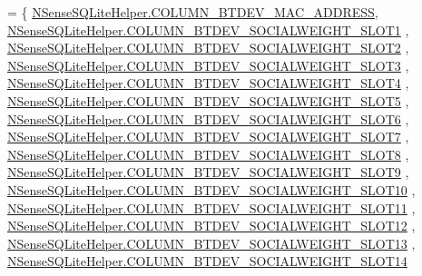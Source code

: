 \begin{DoxyCode}
= \{ 
            \hyperlink{classcs_1_1nsense_1_1db_1_1_n_sense_s_q_lite_helper_a66d760b81948efc86eafb0bb5147c2a5}{NSenseSQLiteHelper.COLUMN\_BTDEV\_MAC\_ADDRESS},
            \hyperlink{classcs_1_1nsense_1_1db_1_1_n_sense_s_q_lite_helper_a2d1874e05b0dcb1f6628c54ed0b027af}{NSenseSQLiteHelper.COLUMN\_BTDEV\_SOCIALWEIGHT\_SLOT1}
      ,
            \hyperlink{classcs_1_1nsense_1_1db_1_1_n_sense_s_q_lite_helper_aa8f004540621f676c6776de2c9f44b37}{NSenseSQLiteHelper.COLUMN\_BTDEV\_SOCIALWEIGHT\_SLOT2}
      ,
            \hyperlink{classcs_1_1nsense_1_1db_1_1_n_sense_s_q_lite_helper_a4015db276ba22912d70ece5b54c81b43}{NSenseSQLiteHelper.COLUMN\_BTDEV\_SOCIALWEIGHT\_SLOT3}
      ,
            \hyperlink{classcs_1_1nsense_1_1db_1_1_n_sense_s_q_lite_helper_a0e353ae98c5e536373cea2af063fc1be}{NSenseSQLiteHelper.COLUMN\_BTDEV\_SOCIALWEIGHT\_SLOT4}
      ,
            \hyperlink{classcs_1_1nsense_1_1db_1_1_n_sense_s_q_lite_helper_a7dbad974bb6a01f5f64b4da61408bec5}{NSenseSQLiteHelper.COLUMN\_BTDEV\_SOCIALWEIGHT\_SLOT5}
      ,
            \hyperlink{classcs_1_1nsense_1_1db_1_1_n_sense_s_q_lite_helper_a892b29c63543d2510b4f543ede759c53}{NSenseSQLiteHelper.COLUMN\_BTDEV\_SOCIALWEIGHT\_SLOT6}
      ,
            \hyperlink{classcs_1_1nsense_1_1db_1_1_n_sense_s_q_lite_helper_aff13368b80bfd063e70429ef497c4799}{NSenseSQLiteHelper.COLUMN\_BTDEV\_SOCIALWEIGHT\_SLOT7}
      ,
            \hyperlink{classcs_1_1nsense_1_1db_1_1_n_sense_s_q_lite_helper_a168a795573ef5c7bb454fdd111ba33bc}{NSenseSQLiteHelper.COLUMN\_BTDEV\_SOCIALWEIGHT\_SLOT8}
      ,
            \hyperlink{classcs_1_1nsense_1_1db_1_1_n_sense_s_q_lite_helper_adc42fbf682a0fb1e2ea2157e3bf019b4}{NSenseSQLiteHelper.COLUMN\_BTDEV\_SOCIALWEIGHT\_SLOT9}
      ,
            \hyperlink{classcs_1_1nsense_1_1db_1_1_n_sense_s_q_lite_helper_aede34e6a126ed327009cd2811f24b4a4}{NSenseSQLiteHelper.COLUMN\_BTDEV\_SOCIALWEIGHT\_SLOT10}
      ,
            \hyperlink{classcs_1_1nsense_1_1db_1_1_n_sense_s_q_lite_helper_a15720b6758996b12d01098b5c69a5cf1}{NSenseSQLiteHelper.COLUMN\_BTDEV\_SOCIALWEIGHT\_SLOT11}
      ,
            \hyperlink{classcs_1_1nsense_1_1db_1_1_n_sense_s_q_lite_helper_a77faece94b4e52583a43ecae43490ba3}{NSenseSQLiteHelper.COLUMN\_BTDEV\_SOCIALWEIGHT\_SLOT12}
      ,
            \hyperlink{classcs_1_1nsense_1_1db_1_1_n_sense_s_q_lite_helper_a9f6a0352030105ea7c51243b9f20d2af}{NSenseSQLiteHelper.COLUMN\_BTDEV\_SOCIALWEIGHT\_SLOT13}
      ,
            \hyperlink{classcs_1_1nsense_1_1db_1_1_n_sense_s_q_lite_helper_af5dccc4390220fd85b4e79bbca7c2879}{NSenseSQLiteHelper.COLUMN\_BTDEV\_SOCIALWEIGHT\_SLOT14}

\end{DoxyCode}

